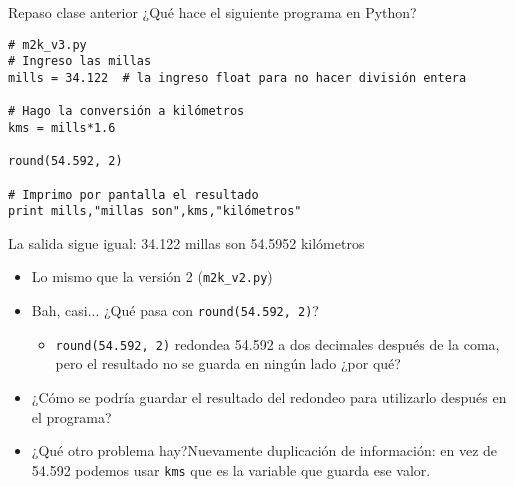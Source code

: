 \documentclass[9pt]{beamer}
\begin{document}
\begin{frame}[fragile]{Repaso clase anterior}
¿Qué hace el siguiente programa en Python?
\footnotesize{\begin{verbatim}
# m2k_v3.py
# Ingreso las millas
mills = 34.122  # la ingreso float para no hacer división entera

# Hago la conversión a kilómetros
kms = mills*1.6

round(54.592, 2)

# Imprimo por pantalla el resultado
print mills,"millas son",kms,"kilómetros"
	\end{verbatim}}\pause
La salida sigue igual: 34.122 millas son 54.5952 kilómetros\pause
\begin{itemize}
	\item Lo mismo que la versión 2 (\verb|m2k_v2.py|) \pause
	\item Bah, casi... ¿Qué pasa con \verb|round(54.592, 2)|? \pause 
	\begin{itemize}
		\item \verb|round(54.592, 2)| redondea 54.592 a dos decimales después de la coma, pero \alert{el resultado no se guarda en ningún lado} ¿por qué?
	\end{itemize}\pause
	\item ¿Cómo se podría guardar el resultado del redondeo para utilizarlo después en el programa?\pause
	\item ¿Qué otro problema hay?\pause\hspace{.1cm}Nuevamente \alert{duplicación de información}: en vez de 54.592 podemos usar \verb|kms| que es la variable que guarda ese valor.
\end{itemize}

\end{frame}
\end{document}
